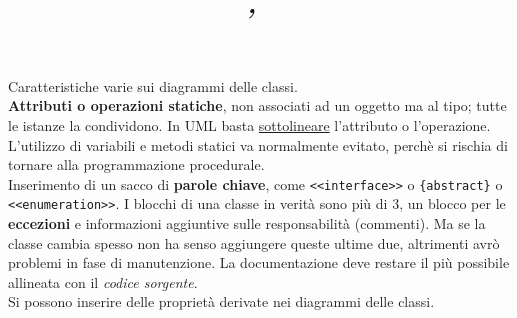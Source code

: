 


\pagestyle{fancy}
\rhead{\firstxmark} %
\lfoot{\lastxmark} %
\cfoot{} %
\renewcommand\headrulewidth{0.4pt} %
\renewcommand\footrulewidth{0.4pt} %


\title{
\vspace{2in}
\textmd{\textbf{}\\
\normalsize\vspace{0.1in}\small{}\\
\vspace{0.1in}\large{\textit{,\ }}
\vspace{3in}
}
}

\author{\textbf{}}
\date{} %




\maketitle
\newpage
\newpage

Caratteristiche varie sui diagrammi delle classi.\\
\textbf{Attributi o operazioni statiche}, non associati ad un oggetto ma al tipo; tutte le istanze la condividono. In UML basta \underline{sottolineare} l'attributo o l'operazione. L'utilizzo di variabili e metodi statici va normalmente evitato, perchè si rischia di tornare alla programmazione procedurale.\\
Inserimento di un sacco di \textbf{parole chiave}, come \texttt{<<interface>>} o \texttt{\{abstract\}} o \texttt{<<enumeration>>}. I blocchi di una classe in verità sono più di 3, un blocco per le \textbf{eccezioni} e informazioni aggiuntive sulle responsabilità (commenti). Ma se la classe cambia spesso non ha senso aggiungere queste ultime due, altrimenti avrò problemi in fase di manutenzione. La documentazione deve restare il più possibile allineata con il \textit{codice sorgente}.\\
Si possono inserire delle proprietà derivate nei diagrammi delle classi.

